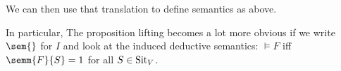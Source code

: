 We can then use that translation to define semantics as above.

In particular, The proposition lifting becomes a lot more obvious if we write $\sem{}$ for $I$ and look at the induced deductive semantics: $\models F$ iff $\semm{F}{S}=1$ for all $S\in\mathrm{Sit}_V$.


%
%
%
%
%
%
%
%
%
%
%
%
%

%
